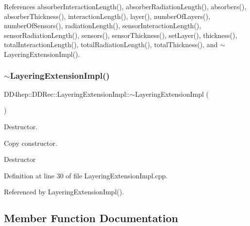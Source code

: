 References absorber\+Interaction\+Length(), absorber\+Radiation\+Length(), absorbers(), absorber\+Thickness(), interaction\+Length(), layer(), number\+Of\+Layers(), number\+Of\+Sensors(), radiation\+Length(), sensor\+Interaction\+Length(), sensor\+Radiation\+Length(), sensors(), sensor\+Thickness(), set\+Layer(), thickness(), total\+Interaction\+Length(), total\+Radiation\+Length(), total\+Thickness(), and $\sim$\+Layering\+Extension\+Impl().

\hypertarget{class_d_d4hep_1_1_d_d_rec_1_1_layering_extension_impl_a12c9038ed17e445cf503abb692e87657}{}\label{class_d_d4hep_1_1_d_d_rec_1_1_layering_extension_impl_a12c9038ed17e445cf503abb692e87657} 
\subsubsection{\texorpdfstring{$\sim$\+Layering\+Extension\+Impl()}{~LayeringExtensionImpl()}}
{\footnotesize\ttfamily D\+D4hep\+::\+D\+D\+Rec\+::\+Layering\+Extension\+Impl\+::$\sim$\+Layering\+Extension\+Impl (\begin{DoxyParamCaption}{ }\end{DoxyParamCaption})\hspace{0.3cm}{\ttfamily [virtual]}}



Destructor. 

Copy constructor.

Destructor 

Definition at line 30 of file Layering\+Extension\+Impl.\+cpp.



Referenced by Layering\+Extension\+Impl().



\subsection{Member Function Documentation}
\hypertarget{class_d_d4hep_1_1_d_d_rec_1_1_layering_extension_impl_aeae62d21c9f9d6a4b3a19db6d3cd28a3}{}\label{class_d_d4hep_1_1_d_d_rec_1_1_layering_extension_impl_aeae62d21c9f9d6a4b3a19db6d3cd28a3} 
